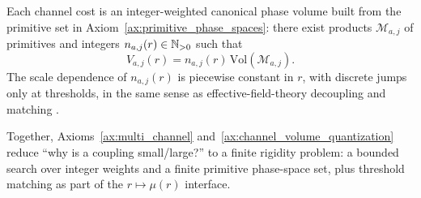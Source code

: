 \begin{axiom}\label{ax:channel_volume_quantization}
Each channel cost is an integer-weighted canonical phase volume built from the primitive set in Axiom~\ref{ax:primitive_phase_spaces}: there exist products $\mathcal{M}_{a,j}$ of primitives and integers $n_{a,j}(r)\in\mathbb{N}_{>0}$ such that
\begin{equation}
V_{a,j}(r)=n_{a,j}(r)\,\mathrm{Vol}(\mathcal{M}_{a,j}).
\end{equation}
The scale dependence of $n_{a,j}(r)$ is piecewise constant in $r$, with discrete jumps only at thresholds, in the same sense as effective-field-theory decoupling and matching \cite{AppelquistCarazzone1975,PeskinSchroeder1995,PDGRPP2024}.
\end{axiom}

Together, Axioms~\ref{ax:multi_channel} and~\ref{ax:channel_volume_quantization} reduce ``why is a coupling small/large?'' to a finite rigidity problem: a bounded search over integer weights and a finite primitive phase-space set, plus threshold matching as part of the $r\mapsto\mu(r)$ interface.
